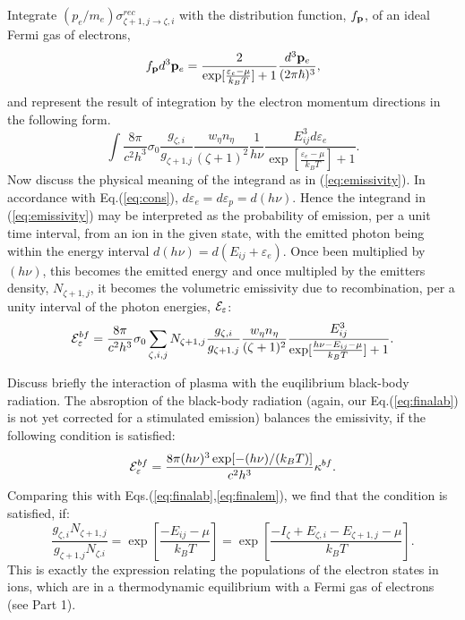 Integrate $(p_e/m_e)\sigma^{rec}_{\zeta+1,j\rightarrow\zeta,i}$ with the distribution function, 
$f_{\bf p}$, of an ideal Fermi gas of electrons,
\begin{equation}
f_{\bf p}d^3{\bf p}_e=\frac{2}{\exp[\frac{\varepsilon_e -\mu}{k_BT}]+1}\frac{d^3{\bf p}_e}{(2\pi\hbar)^3},
\end{equation}
and represent the result of integration by the electron momentum directions in the following form.
\begin{equation}\label{eq:emissivity}
\int{\frac{8\pi}{c^2 h^3}\sigma_0
\frac{g_{\zeta,i} } { g_{\zeta+1.j} }
\frac{w_\eta n_\eta}{(\zeta+1)^2}
\frac1{h\nu}
\frac{ E_{ij}^3 d\varepsilon_e}
{\exp[\frac{\varepsilon_e -\mu}{k_BT}]+1}}.
\end{equation}
Now discuss the physical meaning of the integrand as in (\ref{eq:emissivity}). In accordance with Eq.(\ref{eq:cons}), $d\varepsilon_e=d\varepsilon_p=d(h\nu)$. Hence the 
integrand in (\ref{eq:emissivity}) may be interpreted as the probability of emission, per a unit time interval, from an ion in the given state, with the emitted photon
being within the energy interval $d(h\nu) = d(E_{ij} + \varepsilon_e)$. Once been multiplied by $(h\nu)$, this becomes the emitted energy and once multipled by the emitters 
density, $N_{\zeta+1,j}$, it becomes the volumetric emissivity due to recombination, per a unity interval of the photon energies, ${\cal E}_\varepsilon$:
\begin{equation}\label{eq:finalem}
{\cal E}^{bf}_\varepsilon =\frac{8\pi}{c^2 h^3} \sigma_0
\sum_{\zeta,i,j}{N_{\zeta+1,j} \frac{g_{\zeta,i} } { g_{\zeta+1.j} }\frac{w_\eta n_\eta}{(\zeta+1)^2}
\frac{ E_{ij}^3}
{\exp[\frac{h\nu - E_{ij} -\mu}{k_BT}]+1}}.
\end{equation}

Discuss briefly the interaction of plasma with the euqilibrium black-body radiation. The absroption of the black-body radiation
(again, our Eq.(\ref{eq:finalab}) is not yet corrected for a stimulated emission) balances the emissivity, if the following condition is satisfied:
\begin{equation}
{\cal E}^{bf}_\varepsilon =\frac{8\pi(h\nu)^3\exp[-(h\nu)/(k_BT)]}{c^2 h^3} \kappa^{bf}.
\end{equation} 
Comparing this with Eqs.(\ref{eq:finalab},\ref{eq:finalem}), we find that the condition is satisfied, if:
\begin{equation}
 \frac{g_{\zeta,i} N_{\zeta+1,j}} {g_{\zeta+1.j} N_{\zeta.i} } = \exp[\frac{ -E_{ij} -\mu}{k_BT}] = \exp[\frac{ -I_\zeta +E_{\zeta,i}-E_{\zeta+1,j} -\mu}{k_BT}].
\end{equation}
This is exactly the expression relating the populations of the electron states in ions, which are in a thermodynamic equilibrium with a Fermi gas of electrons (see Part 1).
